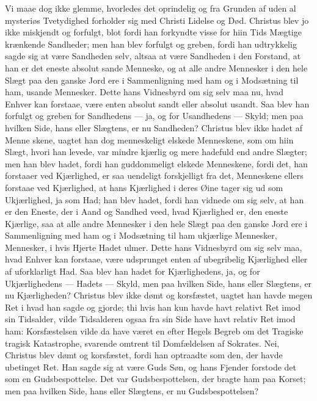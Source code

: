 \documentclass[12pt]{book}
\begin{document}
Vi maae dog ikke glemme, hvorledes det oprindelig og fra Grunden af
uden al mysteriøs Tvetydighed forholder sig med Christi Lidelse og
Død. Christus blev jo ikke miskjendt og forfulgt, blot fordi han
forkyndte visse for hiin Tids Mægtige krænkende Sandheder; men han
blev forfulgt og greben, fordi han udtrykkelig sagde sig at være
Sandheden selv, altsaa at være Sandheden i den Forstand, at han er
det eneste absolut sande Menneske, og at alle andre Mennesker i den
hele Slægt paa den ganske Jord ere i Sammenligning med ham og i
Modsætning til ham, usande Mennesker. Dette hans Vidnesbyrd om sig
selv maa nu, hvad Enhver kan forstaae, være enten absolut sandt
eller absolut usandt. Saa blev han forfulgt og greben for Sandhedens
--- ja, og for Usandhedens --- Skyld; men paa hvilken Side, hans
eller Slægtens, er nu Sandheden? Christus blev ikke hadet af Menne\-
skene, uagtet han dog menneskeligt elskede Menneskene, som om hiin
Slægt, hvori han levede, var mindre kjærlig og mere hadefuld end
andre Slægter; men han blev hadet, fordi han guddommeligt elskede
Menneskene, fordi det, han forstaaer ved Kjærlighed, er saa
uendeligt forskjelligt fra det, Menneskene ellers forstaae ved
Kjærlighed, at hans Kjærlighed i deres Øine tager sig ud som
Ukjærlighed, ja som Had; han blev hadet, fordi han vidnede om sig
selv, at han er den Eneste, der i Aand og Sandhed veed, hvad
Kjærlighed er, den eneste Kjærlige, saa at alle andre Mennesker i
den hele Slægt paa den ganske Jord ere i Sammenligning med ham og i
Modsætning til ham ukjærlige Mennesker, Mennesker, i hvis Hjerte
Hadet ulmer. Dette hans Vidnesbyrd om sig selv maa, hvad Enhver kan
forstaae, være udsprunget enten af ubegribelig Kjærlighed eller af
uforklarligt Had. Saa blev han hadet for Kjærlighedens, ja, og for
Ukjærlighedens --- Hadets --- Skyld, men paa hvilken Side, hans
eller Slægtens, er nu Kjærligheden? Christus blev ikke dømt og
korsfæstet, uagtet han havde megen Ret i hvad han sagde og gjorde;
thi hvis han kun havde havt relativt Ret imod sin Tidsalder, vilde
Tidsalderen ogsaa fra sin Side have havt relativ Ret imod ham:
Korsfæstelsen vilde da have været en efter Hegels Begreb om det
Tragiske tragisk Katastrophe, svarende omtrent til Domfældelsen af
Sokrates. Nei, Christus blev dømt og korsfæstet, fordi han optraadte
som den, der havde ubetinget Ret. Han sagde sig at være Guds Søn, og
hans Fjender forstode det som en Gudsbespottelse. Det var
Gudsbespottelsen, der bragte ham paa Korset; men paa hvilken Side,
hans eller Slægtens, er nu Gudsbespottelsen?
\end{document}
